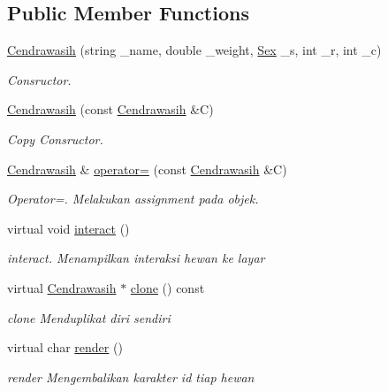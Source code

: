 \subsection*{Public Member Functions}
\begin{DoxyCompactItemize}
\item 
\hyperlink{classCendrawasih_abf454396e2e763de85b2529c58c5e550}{Cendrawasih} (string \+\_\+name, double \+\_\+weight, \hyperlink{sex_8h_a2633cb393c68bb2ee8080db58fb7ba93}{Sex} \+\_\+s, int \+\_\+r, int \+\_\+c)
\begin{DoxyCompactList}\small\item\em Consructor. \end{DoxyCompactList}\item 
\hyperlink{classCendrawasih_aa224bbf2b313972f0f4fc18a640d1a8a}{Cendrawasih} (const \hyperlink{classCendrawasih}{Cendrawasih} \&C)
\begin{DoxyCompactList}\small\item\em Copy Consructor. \end{DoxyCompactList}\item 
\hyperlink{classCendrawasih}{Cendrawasih} \& \hyperlink{classCendrawasih_ac96cdea48fe452c5ee2c8af7640fa15e}{operator=} (const \hyperlink{classCendrawasih}{Cendrawasih} \&C)
\begin{DoxyCompactList}\small\item\em Operator=. Melakukan assignment pada objek. \end{DoxyCompactList}\item 
virtual void \hyperlink{classCendrawasih_ab24c4c34838000da51a810dec7d29669}{interact} ()
\begin{DoxyCompactList}\small\item\em interact. Menampilkan interaksi hewan ke layar \end{DoxyCompactList}\item 
virtual \hyperlink{classCendrawasih}{Cendrawasih} $\ast$ \hyperlink{classCendrawasih_a39cf4d2c4a8008a0d6e1292f1cbb86b2}{clone} () const 
\begin{DoxyCompactList}\small\item\em clone Menduplikat diri sendiri \end{DoxyCompactList}\item 
virtual char \hyperlink{classCendrawasih_aa669346ff22d3fb1c2df2f4e3170356d}{render} ()
\begin{DoxyCompactList}\small\item\em render Mengembalikan karakter id tiap hewan \end{DoxyCompactList}\item 

\end{DoxyCompactItemize}
